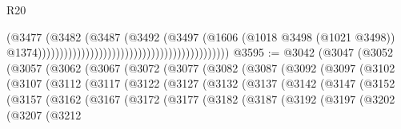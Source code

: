 \begin{lexlean}{R20}
\begin{coremodule}
                                                                                (@3477
                                                                                  (@3482
                                                                                    (@3487
                                                                                      (@3492
                                                                                        (@3497
                                                                                          (@1606
                                                                                            (@1018
                                                                                              @3498
                                                                                              (@1021
                                                                                                @3498))
                                                                                            @1374))))))))))))))))))))))))))))))))))))))))))))
@3595 := @3042
    (@3047
      (@3052
        (@3057
          (@3062
            (@3067
              (@3072
                (@3077
                  (@3082
                    (@3087
                      (@3092
                        (@3097
                          (@3102
                            (@3107
                              (@3112
                                (@3117
                                  (@3122
                                    (@3127
                                      (@3132
                                        (@3137
                                          (@3142
                                            (@3147
                                              (@3152
                                                (@3157
                                                  (@3162
                                                    (@3167
                                                      (@3172
                                                        (@3177
                                                          (@3182
                                                            (@3187
                                                              (@3192
                                                                (@3197
                                                                  (@3202
                                                                    (@3207
                                                                      (@3212

\end{coremodule}
\end{lexlean}
